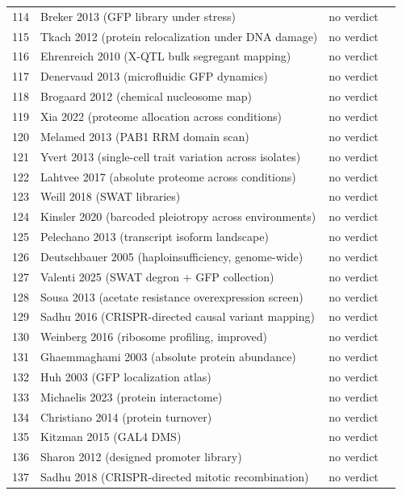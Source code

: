 \begin{longtable}{@{}r L{88mm} L{40mm} L{24mm}@{}}
114 & Breker 2013 (GFP library under stress) & no verdict &  \\
115 & Tkach 2012 (protein relocalization under DNA damage) & no verdict &  \\
116 & Ehrenreich 2010 (X-QTL bulk segregant mapping) & no verdict &  \\
117 & Denervaud 2013 (microfluidic GFP dynamics) & no verdict &  \\
118 & Brogaard 2012 (chemical nucleosome map) & no verdict &  \\
119 & Xia 2022 (proteome allocation across conditions) & no verdict &  \\
120 & Melamed 2013 (PAB1 RRM domain scan) & no verdict &  \\
121 & Yvert 2013 (single-cell trait variation across isolates) & no verdict &  \\
122 & Lahtvee 2017 (absolute proteome across conditions) & no verdict &  \\
123 & Weill 2018 (SWAT libraries) & no verdict &  \\
124 & Kinsler 2020 (barcoded pleiotropy across environments) & no verdict &  \\
125 & Pelechano 2013 (transcript isoform landscape) & no verdict &  \\
126 & Deutschbauer 2005 (haploinsufficiency, genome-wide) & no verdict &  \\
127 & Valenti 2025 (SWAT degron + GFP collection) & no verdict &  \\
128 & Sousa 2013 (acetate resistance overexpression screen) & no verdict &  \\
129 & Sadhu 2016 (CRISPR-directed causal variant mapping) & no verdict &  \\
130 & Weinberg 2016 (ribosome profiling, improved) & no verdict &  \\
131 & Ghaemmaghami 2003 (absolute protein abundance) & no verdict &  \\
132 & Huh 2003 (GFP localization atlas) & no verdict &  \\
133 & Michaelis 2023 (protein interactome) & no verdict &  \\
134 & Christiano 2014 (protein turnover) & no verdict &  \\
135 & Kitzman 2015 (GAL4 DMS) & no verdict &  \\
136 & Sharon 2012 (designed promoter library) & no verdict &  \\
137 & Sadhu 2018 (CRISPR-directed mitotic recombination) & no verdict &  \\

\end{longtable}
